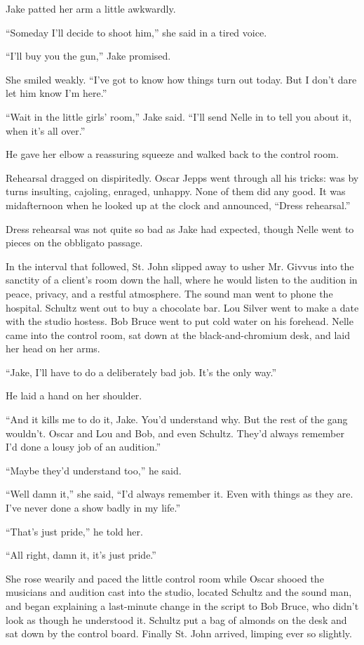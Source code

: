 \documentclass{novel}
\begin{document}
Jake patted her arm a little awkwardly.

“Someday I'll decide to shoot him,” she said in a tired voice.

“I’ll buy you the gun,” Jake promised.

She smiled weakly. “I’ve got to know how things turn out today. But I don’t dare let him know I’m here.”

“Wait in the little girls’ room,” Jake said. “I’ll send Nelle in to tell you about it, when it’s all over.”

He gave her elbow a reassuring squeeze and walked back to the control room.

Rehearsal dragged on dispiritedly. Oscar Jepps went through all his tricks: was by turns insulting, cajoling, enraged, unhappy. None of them did any good. It was midafternoon when he looked up at the clock and announced, “Dress rehearsal.”

Dress rehearsal was not quite so bad as Jake had expected, though Nelle went to pieces on the obbligato passage.

In the interval that followed, St. John slipped away to usher Mr. Givvus into the sanctity of a client’s room down the hall, where he would listen to the audition in peace, privacy, and a restful atmosphere. The sound man went to phone the hospital. Schultz went out to buy a chocolate bar. Lou Silver went to make a date with the studio hostess. Bob Bruce went to put cold water on his forehead. Nelle came into the control room, sat down at the black-and-chromium desk, and laid her head on her arms.

“Jake, I'll have to do a deliberately bad job. It’s the only way.”

He laid a hand on her shoulder.

“And it kills me to do it, Jake. You’d understand why. But the rest of the gang wouldn’t. Oscar and Lou and Bob, and even Schultz. They’d always remember I’d done a lousy job of an audition.”

“Maybe they’d understand too,” he said.

“Well damn it,” she said, “I’d always remember it. Even with things as they are. I’ve never done a show badly in my life.”

“That’s just pride,” he told her.

“All right, damn it, it’s just pride.”

She rose wearily and paced the little control room while Oscar shooed the musicians and audition cast into the studio, located Schultz and the sound man, and began explaining a last-minute change in the script to Bob Bruce, who didn’t look as though he understood it. Schultz put a bag of almonds on the desk and sat down by the control board. Finally St. John arrived, limping ever so slightly.
\end{document}

